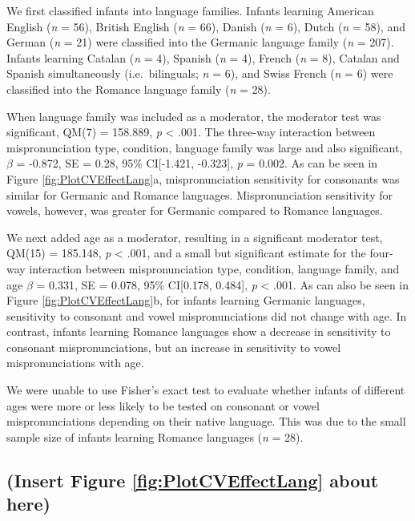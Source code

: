 \documentclass[man]{apa6}
\begin{document}
We first classified infants into language families. Infants learning American English (\emph{n} = 56), British English (\emph{n} = 66), Danish (\emph{n} = 6), Dutch (\emph{n} = 58), and German (\emph{n} = 21) were classified into the Germanic language family (\emph{n} = 207). Infants learning Catalan (\emph{n} = 4), Spanish (\emph{n} = 4), French (\emph{n} = 8), Catalan and Spanish simultaneously (i.e.~bilinguals; \emph{n} = 6), and Swiss French (\emph{n} = 6) were classified into the Romance language family (\emph{n} = 28).

When language family was included as a moderator, the moderator test was significant, QM(7) = 158.889, \emph{p} \textless{} .001. The three-way interaction between mispronunciation type, condition, language family was large and also significant, \(\beta\) = -0.872, SE = 0.28, 95\% CI{[}-1.421, -0.323{]}, \emph{p} = 0.002. As can be seen in Figure \ref{fig:PlotCVEffectLang}a, mispronunciation sensitivity for consonants was similar for Germanic and Romance languages. Mispronunciation sensitivity for vowels, however, was greater for Germanic compared to Romance languages.

We next added age as a moderator, resulting in a significant moderator test, QM(15) = 185.148, \emph{p} \textless{} .001, and a small but significant estimate for the four-way interaction between mispronunciation type, condition, language family, and age \(\beta\) = 0.331, SE = 0.078, 95\% CI{[}0.178, 0.484{]}, \emph{p} \textless{} .001. As can also be seen in Figure \ref{fig:PlotCVEffectLang}b, for infants learning Germanic languages, sensitivity to consonant and vowel mispronunciations did not change with age. In contrast, infants learning Romance languages show a decrease in sensitivity to consonant mispronunciations, but an increase in sensitivity to vowel mispronunciations with age.

We were unable to use Fisher's exact test to evaluate whether infants of different ages were more or less likely to be tested on consonant or vowel mispronunciations depending on their native language. This was due to the small sample size of infants learning Romance languages (\emph{n} = 28).

\hypertarget{insert-figure-reffigplotcveffectlang-about-here}{%
\subsection{(Insert Figure \ref{fig:PlotCVEffectLang} about here)}\label{insert-figure-reffigplotcveffectlang-about-here}}
\end{document}
